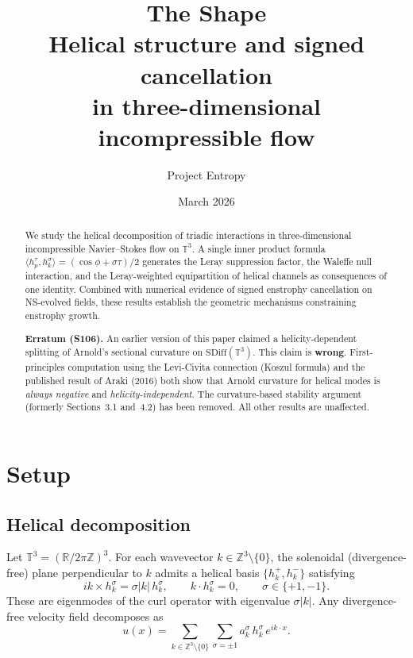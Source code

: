 \documentclass[11pt]{article}
\title{The Shape\\[6pt]
\large Helical structure and signed cancellation\\
in three-dimensional incompressible flow}
\author{Project Entropy}
\date{March 2026}
\theoremstyle{definition}
\theoremstyle{remark}
\begin{document}
\maketitle

\begin{abstract}
We study the helical decomposition of triadic interactions in
three-dimensional incompressible Navier--Stokes flow on $\mathbb{T}^3$.
A single inner product formula $\langle h_p^\tau, h_k^\sigma \rangle
= (\cos\phi + \sigma\tau)/2$ generates the Leray suppression factor,
the Waleffe null interaction, and the Leray-weighted equipartition of
helical channels as consequences of one identity. Combined with
numerical evidence of signed enstrophy cancellation on NS-evolved
fields, these results establish the geometric mechanisms constraining
enstrophy growth.

\medskip\noindent
\textbf{Erratum (S106).} An earlier version of this paper claimed a
helicity-dependent splitting of Arnold's sectional curvature on
$\mathrm{SDiff}(\mathbb{T}^3)$. This claim is \textbf{wrong}.
First-principles computation using the Levi-Civita connection (Koszul
formula) and the published result of Araki (2016) both show that
Arnold curvature for helical modes is \emph{always negative} and
\emph{helicity-independent}. The curvature-based stability argument
(formerly Sections~3.1 and~4.2) has been removed. All other results
are unaffected.
\end{abstract}

\section{Setup}

\subsection{Helical decomposition}

Let $\mathbb{T}^3 = (\mathbb{R}/2\pi\mathbb{Z})^3$. For each wavevector
$k \in \mathbb{Z}^3 \setminus \{0\}$, the solenoidal (divergence-free)
plane perpendicular to $k$ admits a helical basis $\{h_k^+, h_k^-\}$
satisfying
\[
  ik \times h_k^\sigma = \sigma |k|\, h_k^\sigma, \qquad
  k \cdot h_k^\sigma = 0, \qquad
  \sigma \in \{+1, -1\}.
\]
These are eigenmodes of the curl operator with eigenvalue $\sigma|k|$.
Any divergence-free velocity field decomposes as
\[
  u(x) = \sum_{k \in \mathbb{Z}^3 \setminus \{0\}} \sum_{\sigma = \pm 1}
  a_k^\sigma\, h_k^\sigma\, e^{ik \cdot x}.
\]
\end{document}
